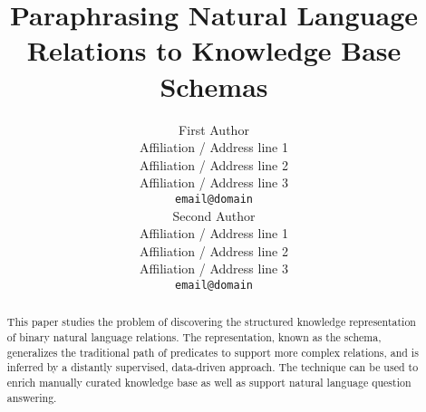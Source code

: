 \documentclass[11pt]{article}
\title{Paraphrasing Natural Language Relations to Knowledge Base Schemas}
\author{First Author \\
  Affiliation / Address line 1 \\
  Affiliation / Address line 2 \\
  Affiliation / Address line 3 \\
  {\tt email@domain} \\\And
  Second Author \\
  Affiliation / Address line 1 \\
  Affiliation / Address line 2 \\
  Affiliation / Address line 3 \\
  {\tt email@domain} \\}
\date{}
\begin{document}
\maketitle
\begin{abstract}
This paper studies the problem of discovering the
structured knowledge representation of binary 
natural language relations. The representation, known as
the schema, generalizes the traditional path of predicates to support
more complex relations,
and is inferred by a distantly supervised, data-driven approach.
The technique can be used to enrich manually curated knowledge
base as well as support natural language question answering.
\end{abstract}












%
%


\end{document}
